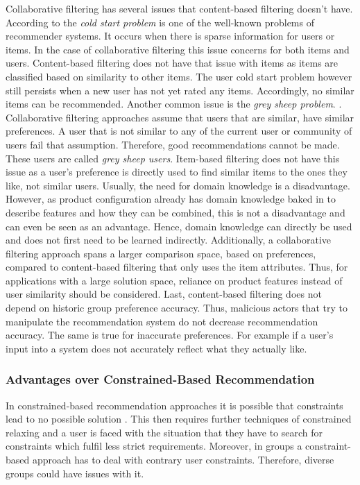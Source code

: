 Collaborative filtering has several issues that content-based filtering doesn't have. According to \citeauthor{likaFacingColdStart2014} \cite{likaFacingColdStart2014} the \emph{cold start problem} is one of the well-known problems of recommender systems. It occurs when there is sparse information for users or items. In the case of collaborative filtering this issue concerns for both items and users. Content-based filtering does not have that issue with items as items are classified based on similarity to other items. The user cold start problem however still persists when a new user has not yet rated any items. Accordingly, no similar items can be recommended. 
Another common issue is the \emph{grey sheep problem}. \citeauthor{grasIdentifyingGreySheep2016} \cite{grasIdentifyingGreySheep2016}. Collaborative filtering approaches assume that users that are similar, have similar preferences. A user that is not similar to any of the current user or community of users fail that assumption. Therefore, good recommendations cannot be made. These users are called \emph{grey sheep users}. Item-based filtering does not have this issue as a user's preference is directly used to find similar items to the ones they like, not similar users.
Usually, the need for domain knowledge is a disadvantage. However, as product configuration already has domain knowledge baked in to describe features and how they can be combined, this is not a disadvantage and can even be seen as an advantage. Hence, domain knowledge can directly be used and does not first need to be learned indirectly.
Additionally, a collaborative filtering approach spans a larger comparison space, based on preferences, compared to content-based filtering that only uses the item attributes. Thus, for applications with a large solution space, reliance on product features instead of user similarity should be considered.
Last, content-based filtering does not depend on historic group preference accuracy. Thus, malicious actors that try to manipulate the recommendation system do not decrease recommendation accuracy. The same is true for inaccurate preferences. For example if a user's input into a system does not accurately reflect what they actually like.

\subsubsection{Advantages over Constrained-Based Recommendation}

In constrained-based recommendation approaches it is possible that constraints lead to no possible solution \cite[~ p. 44]{felfernigAlgorithmsGroupRecommendation2018}. This then requires further techniques of constrained relaxing and a user is faced with the situation that they have to search for constraints which fulfil less strict requirements. Moreover, in groups a constraint-based approach has to deal with contrary user constraints. Therefore, diverse groups could have issues with it.

